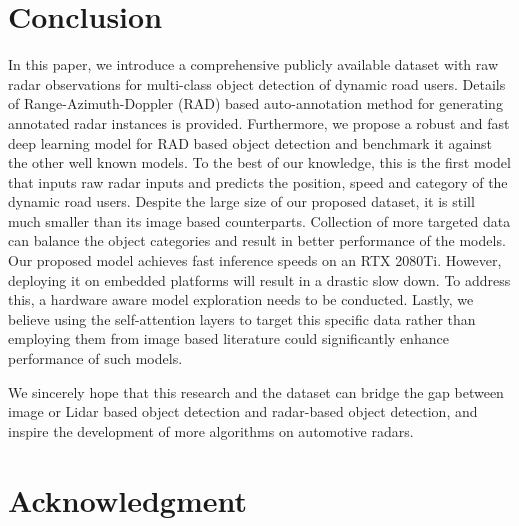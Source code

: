 \documentclass[10pt, conference, compsocconf]{IEEEtran}
\begin{document}



\section{Conclusion}

In this paper, we introduce a comprehensive publicly available dataset with raw radar observations for multi-class object detection of dynamic road users. Details of Range-Azimuth-Doppler (RAD) based auto-annotation method for generating annotated radar instances is provided. Furthermore, we propose a robust and fast deep learning model for RAD based object detection and benchmark it against the other well known models. To the best of our knowledge, this is the first model that inputs raw radar inputs and predicts the position, speed and category of the dynamic road users. Despite the large size of our proposed dataset, it is still much smaller than its image based counterparts. Collection of more targeted data can balance the object categories and result in better performance of the models. Our proposed model achieves fast inference speeds on an RTX 2080Ti. However, deploying it on embedded platforms will result in a drastic slow down. To address this, a hardware aware model exploration needs to be conducted. Lastly, we believe using the self-attention layers to target this specific data rather than employing them from image based literature could significantly enhance performance of such models.

We sincerely hope that this research and the dataset can bridge the gap between image or Lidar based object detection and radar-based object detection, and inspire the development of more algorithms on automotive radars.





\section*{Acknowledgment}
\end{document}
